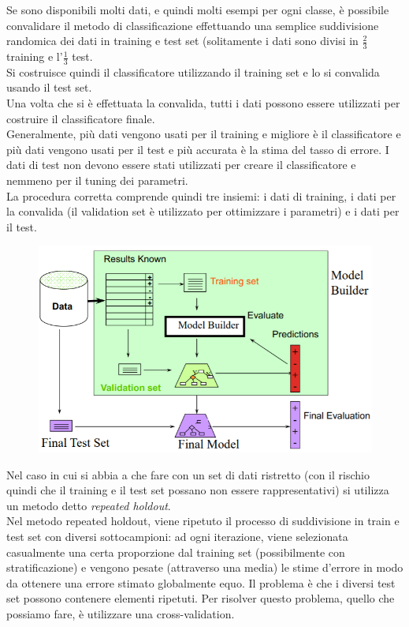 Se sono disponibili molti dati, e quindi molti esempi per ogni classe, è possibile convalidare il metodo di classificazione effettuando una semplice suddivisione randomica dei dati in training e test set (solitamente i dati sono divisi in $\frac{2}{3}$ training e l’$\frac{1}{3}$ test. \\
Si costruisce quindi il classificatore utilizzando il training set e lo si convalida usando il test set.\\

Una volta che si è effettuata la convalida, tutti i dati possono essere utilizzati per costruire il classificatore finale. \\
Generalmente, più dati vengono usati per il training e migliore è il classificatore e più dati vengono usati per il test e più accurata è la stima del tasso di errore. I dati di test non devono essere stati utilizzati per creare il classificatore e nemmeno per il tuning dei parametri.\\

La procedura corretta comprende quindi tre insiemi: i dati di training, i dati per la convalida (il validation set è utilizzato per ottimizzare i parametri) e i dati per il test.

\begin{figure}[H]
    \centering
    \includegraphics[scale=0.7]{imm/model_builder.png}
    \label{fig:model_builder}
\end{figure}

Nel caso in cui si abbia a che fare con un set di dati ristretto (con il rischio quindi che il training e il test set possano non essere rappresentativi) si utilizza un metodo detto \textit{repeated holdout}.\\

Nel metodo repeated holdout, viene ripetuto il processo di suddivisione in train e test set con diversi sottocampioni: ad ogni iterazione, viene selezionata casualmente una certa proporzione dal training set (possibilmente con stratificazione) e vengono pesate (attraverso una media) le stime d’errore in modo da ottenere una errore stimato globalmente equo.
Il problema è che i diversi test set possono contenere elementi ripetuti. Per risolver questo problema, quello che possiamo fare, è utilizzare una cross-validation.

